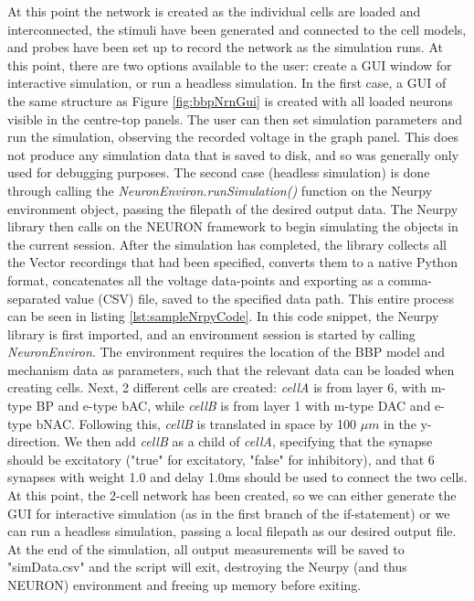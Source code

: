 At this point the network is created as the individual cells are loaded and interconnected, the stimuli have been generated and connected to the cell models, and probes have been set up to record the network as the simulation runs. At this point, there are two options available to the user: create a GUI window for interactive simulation, or run a headless simulation. In the first case, a GUI of the same structure as Figure \ref{fig:bbpNrnGui} is created with all loaded neurons visible in the centre-top panels. The user can then set simulation parameters and run the simulation, observing the recorded voltage in the graph panel. This does not produce any simulation data that is saved to disk, and so was generally only used for debugging purposes. The second case (headless simulation) is done through calling the \emph{NeuronEnviron.runSimulation()} function on the Neurpy environment object, passing the filepath of the desired output data. The Neurpy library then calls on the NEURON framework to begin simulating the objects in the current session. After the simulation has completed, the library collects all the Vector recordings that had been specified, converts them to a native Python format, concatenates all the voltage data-points and exporting as a comma-separated value (CSV) file, saved to the specified data path. This entire process can be seen in listing \ref{lst:sampleNrpyCode}. In this code snippet, the Neurpy library is first imported, and an environment session is started by calling \emph{NeuronEnviron}. The environment requires the location of the BBP model and mechanism data as parameters, such that the relevant data can be loaded when creating cells. Next, 2 different cells are created: \emph{cellA} is from layer 6, with m-type BP and e-type bAC, while \emph{cellB} is from layer 1 with m-type DAC and e-type bNAC. Following this, \emph{cellB} is translated in space by 100 $\mu m$ in the y-direction. We then add \emph{cellB} as a child of \emph{cellA}, specifying that the synapse should be excitatory ("true" for excitatory, "false" for inhibitory), and that 6 synapses with weight 1.0 and delay 1.0ms should be used to connect the two cells. At this point, the 2-cell network has been created, so we can either generate the GUI for interactive simulation (as in the first branch of the if-statement) or we can run a headless simulation, passing a local filepath as our desired output file. At the end of the simulation, all output measurements will be saved to "simData.csv" and the script will exit, destroying the Neurpy (and thus NEURON) environment and freeing up memory before exiting.\\ 



